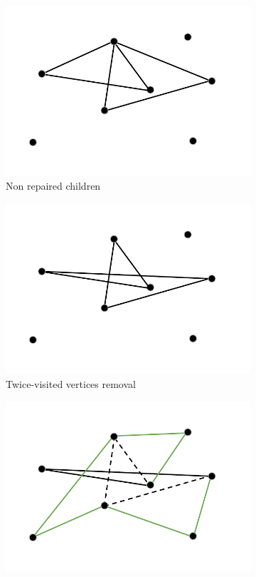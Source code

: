 \begin{figure}[h!]
  \centering
  \begin{subfigure}[b]{0.49\linewidth}
    \includegraphics[width=\linewidth]{media/gene1.pdf}
     \caption{Non repaired children}
  \end{subfigure}
  \begin{subfigure}[b]{0.49\linewidth}
    \includegraphics[width=\linewidth]{media/gene2.pdf}
    \caption{Twice-visited vertices removal}
  \end{subfigure}
  \begin{subfigure}[b]{0.49\linewidth}
    \includegraphics[width=\linewidth]{media/gene3.pdf}

\end{subfigure}
\end{figure}
